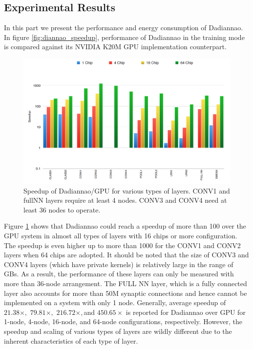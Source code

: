\documentclass[runningheads,a4paper]{llncs}
\begin{document}
{\subsection*{Experimental Results}
In this part we present the performance and energy consumption of Dadiannao. In figure \ref{fig:diannao_speedup}, performance of Dadiannao in the training mode is compared against its NVIDIA K20M GPU implementation counterpart.
\begin{figure}[h]
	\includegraphics[width=\textwidth]{./images/dadiannao_chips.png}
	\centering
	\caption{Speedup of Dadiannao/GPU for various types of layers. CONV1 and fullNN layers require at least 4 nodes. CONV3 and CONV4 need at least 36 nodes to operate\cite{chen2014dadiannao}.}
	\label{fig:dadiannao_speedup}
\end{figure}

Figure \ref{fig:dadiannao_speedup} shows that Dadiannao could reach a speedup of more than 100 over the GPU system in almost all types of layers with 16 chips or more configuration. The speedup is even higher up to more than 1000 for the CONV1 and CONV2 layers when 64 chips are adopted. It should be noted that the size of CONV3 and CONV4 layers (which have private kernels) is relatively large in the range of GBs. As a result, the performance of these layers can only be measured with more than 36-node arrangement. The FULL NN layer, which is a fully connected layer also accounts for more than 50M synaptic connections and hence cannot be implemented on a system with only 1 node. Generally, average speedup of $21.38\times,$ $79.81\times,$ $216.72\times,$and $450.65\times$ is reported for Dadiannao over GPU for 1-node, 4-node, 16-node, and 64-node configurations, respectively. However, the speedup and scaling of various types of layers are wildly different due to the inherent characteristics of each type of layer.\\

}
\end{document}
